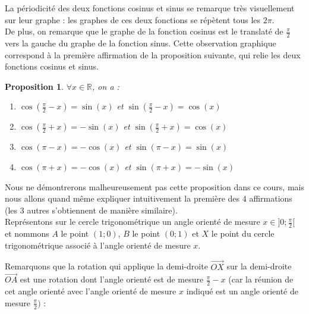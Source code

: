 \documentclass[a4paper,fontsize=13pt]{scrreprt}
\theoremstyle{plain}
\newtheorem{pro}[subsection]{Proposition}
\theoremstyle{definition}
\newcommand{\rr}{\mathbb{R}}
\newcommand {\axes} {
	\draw[thick, ->] (\xmin,0) -- (\xmax+1,0);
	\draw[thick, ->] (0,\ymin) -- (0,\ymax+1);
	\draw (0,\ymax+0.5) node [left] {$y$};
	\draw (\xmax+0.5, 0) node [below] {$x$};
	\draw[thick] (-0.15,1)--(0.15,1) (1,-0.15)--(1,0.15);
	\draw (0,1)node[left]{$1$} (1,0)node[below]{$1$};
}
\begin{document}
La périodicité des deux fonctions cosinus et sinus se remarque très visuellement sur leur graphe : les graphes de ces deux fonctions se répètent tous les $2\pi$. \\
De plus, on remarque que le graphe de la fonction cosinus est le translaté de $\frac{\pi}{2}$ vers la gauche du graphe de la fonction sinus. Cette observation graphique correspond à la première affirmation de la proposition suivante, qui relie les deux fonctions cosinus et sinus.
\newpage
\begin{pro} \label{cossin}
$\forall x \in \rr$, on a :
\begin{enumerate}
\item $\cos(\frac{\pi}{2} - x) = \sin(x)$ et $\sin(\frac{\pi}{2} - x) = \cos(x)$
\item $\cos(\frac{\pi}{2} + x) = -\sin(x)$ et $\sin(\frac{\pi}{2} + x) = \cos(x)$
\item $\cos(\pi - x) = -\cos(x)$ et $\sin(\pi - x) = \sin(x)$
\item $\cos(\pi + x) = -\cos(x)$ et $\sin(\pi + x) = -\sin(x)$
\end{enumerate}
\end{pro}
Nous ne démontrerons malheureusement pas cette proposition dans ce cours, mais nous allons quand même expliquer intuitivement la première des $4$ affirmations (les $3$ autres s'obtiennent de manière similaire). \\
Représentons sur le cercle trigonométrique un angle orienté de mesure $x \in ]0;\frac{\pi}{2}[$ et nommons $A$ le point $(1;0)$, $B$ le point $(0;1)$ et $X$ le point du cercle trigonométrique associé à l'angle orienté de mesure $x$.
\begin{center}
\end{center}
Remarquons que la rotation qui applique la demi-droite $\overrightarrow{OX}$ sur la demi-droite $\overrightarrow{OA}$ est une rotation dont l'angle orienté est de mesure $\frac{\pi}{2}-x$ (car la réunion de cet angle orienté avec l'angle orienté de mesure $x$ indiqué est un angle orienté de mesure $\frac{\pi}{2})$ :
\end{document}
